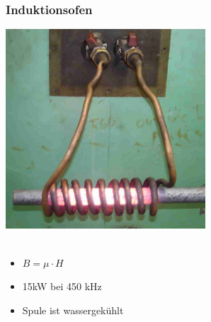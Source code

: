 \begin{frame}
    \frametitle{Induktionsofen}
    \begin{center}
		\includegraphics[width=0.56\textwidth]{a08/Induction_heating_of_bar_crop.jpg}\\
		\tiny \hyperlink{refs}{\cite{wm}} \\[1em] \large
		\begin{itemize}
		\item $B = \mu \cdot H$
			\item 15kW bei 450 kHz
			\item Spule ist wassergekühlt
		\end{itemize}
	\end{center}
\end{frame}


